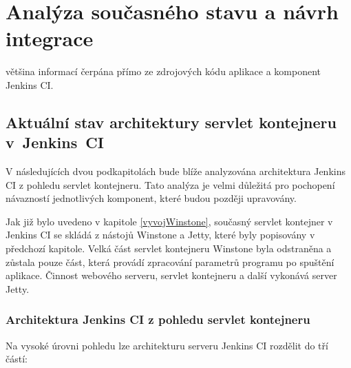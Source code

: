
\chapter{Analýza současného stavu a návrh integrace}
    většina informací čerpána přímo ze zdrojových kódu aplikace a komponent Jenkins CI.
    
    \section{Aktuální stav architektury servlet kontejneru v~Jenkins~CI}
        V následujících dvou podkapitolách bude blíže analyzována architektura
        Jenkins CI z pohledu servlet kontejneru. Tato analýza je velmi důležitá
        pro pochopení návazností jednotlivých komponent, které budou později upravovány.

        Jak již bylo uvedeno v kapitole \ref{vyvojWinstone}, současný servlet kontejner 
        v Jenkins CI se skládá z nástojů Winstone a Jetty, které byly popisovány v 
        předchozí kapitole. Velká část servlet
        kontejneru Winstone byla odstraněna a zůstala pouze část, která
        provádí zpracování parametrů
        programu po spuštění aplikace. Činnost webového serveru, servlet kontejneru
        a další vykonává server Jetty.
        

        \subsection{Architektura Jenkins CI z pohledu servlet kontejneru} \label{secArchitecture}
            Na vysoké úrovni pohledu lze architekturu serveru Jenkins CI rozdělit do tří částí:
            
